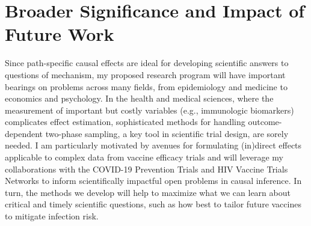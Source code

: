\section{Broader Significance and Impact of Future Work}

Since path-specific causal effects are ideal for developing scientific answers
to questions of mechanism, my proposed research program will have important
bearings on problems across many fields, from epidemiology and medicine to
economics and psychology. In the health and medical sciences, where the
measurement of important but costly variables (e.g., immunologic biomarkers)
complicates effect estimation, sophisticated methods for handling
outcome-dependent two-phase sampling, a key tool in scientific trial design, are
sorely needed. I am particularly motivated by avenues for formulating (in)direct
effects applicable to complex data from vaccine efficacy trials and will
leverage my collaborations with the COVID-19 Prevention Trials and HIV Vaccine
Trials Networks to inform scientifically impactful open problems in causal
inference. In turn, the methods we develop will help to maximize what we can
learn about critical and timely scientific questions, such as how best to tailor
future vaccines to mitigate infection risk.

